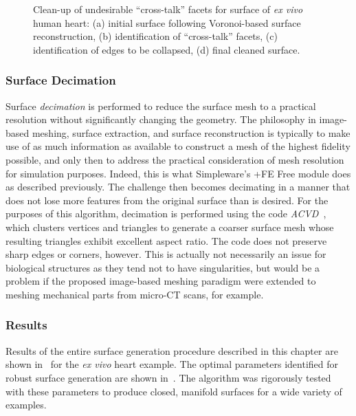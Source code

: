 \begin{figure}
{\label{fig:cross2-4}}		
%
\caption{Clean-up of undesirable ``cross-talk'' facets for surface of \textit{ex vivo} human heart: (a) initial surface following Voronoi-based surface reconstruction, (b) identification of ``cross-talk'' facets, (c) identification of edges to be collapsed, (d) final cleaned surface.}
\label{fig:cross2}
\end{figure}

\subsubsection{Surface Decimation}

Surface \textit{decimation} is performed to reduce the surface mesh to a practical resolution without significantly changing the geometry. The philosophy in image-based meshing, surface extraction, and surface reconstruction is typically to make use of as much information as available to construct a mesh of the highest fidelity possible, and only then to address the practical consideration of mesh resolution for simulation purposes. Indeed, this is what Simpleware's {+FE Free} module does as described previously. The challenge then becomes decimating in a manner that does not lose more features from the original surface than is desired. For the purposes of this algorithm, decimation is performed using the code \textit{ACVD}~\cite{valette_2004, valette_2008}, which clusters vertices and triangles to generate a coarser surface mesh whose resulting triangles exhibit excellent aspect ratio. The code does not preserve sharp edges or corners, however. This is actually not necessarily an issue for biological structures as they tend not to have singularities, but would be a problem if the proposed image-based meshing paradigm were extended to meshing mechanical parts from micro-CT scans, for example.

\subsubsection{Results}

Results of the entire surface generation procedure described in this chapter are shown in~ for the \textit{ex vivo} heart example. The optimal parameters identified for robust surface generation are shown in~. The algorithm was rigorously tested with these parameters to produce closed, manifold surfaces for a wide variety of examples.

